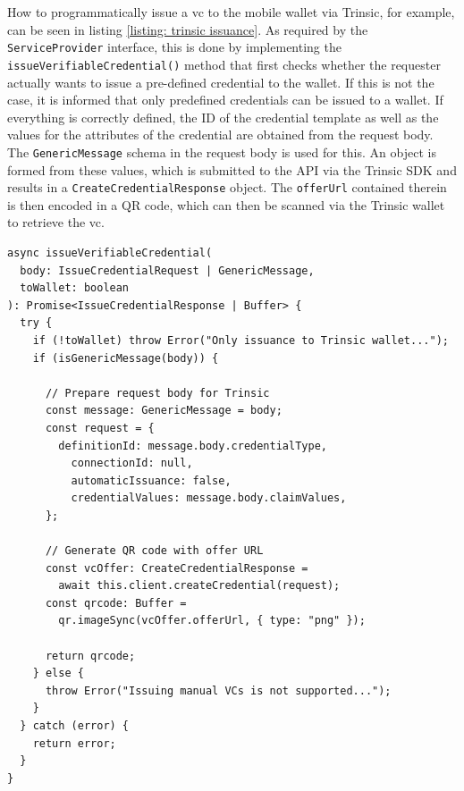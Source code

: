     How to programmatically issue a \ac{vc} to the mobile wallet via Trinsic, for example, can be seen in listing \ref{listing: trinsic issuance}. As required by the \texttt{ServiceProvider} interface, this is done by implementing the \texttt{issueVerifiableCredential()} method that first checks whether the requester actually wants to issue a pre-defined credential to the wallet. If this is not the case, it is informed that only predefined credentials can be issued to a wallet. If everything is correctly defined, the ID of the credential template as well as the values for the attributes of the credential are obtained from the request body. The \texttt{GenericMessage} schema in the request body is used for this. An object is formed from these values, which is submitted to the API via the Trinsic SDK and results in a \texttt{CreateCredentialResponse} object. The \texttt{offerUrl} contained therein is then encoded in a QR code, which can then be scanned via the Trinsic wallet to retrieve the \ac{vc}. 
    \newline
    
    \begin{lstlisting}[style=ES6, caption=\ac{vc} issuance with Trinsic, label={listing: trinsic issuance}]
async issueVerifiableCredential(
  body: IssueCredentialRequest | GenericMessage,
  toWallet: boolean
): Promise<IssueCredentialResponse | Buffer> {
  try {
    if (!toWallet) throw Error("Only issuance to Trinsic wallet...");
    if (isGenericMessage(body)) {
    
      // Prepare request body for Trinsic
      const message: GenericMessage = body;
      const request = {
        definitionId: message.body.credentialType,
          connectionId: null,
          automaticIssuance: false,
          credentialValues: message.body.claimValues,
      };
      
      // Generate QR code with offer URL
      const vcOffer: CreateCredentialResponse = 
        await this.client.createCredential(request);
      const qrcode: Buffer = 
        qr.imageSync(vcOffer.offerUrl, { type: "png" });
        
      return qrcode;
    } else {
      throw Error("Issuing manual VCs is not supported...");
    }
  } catch (error) {
    return error;
  }
}\end{lstlisting}

